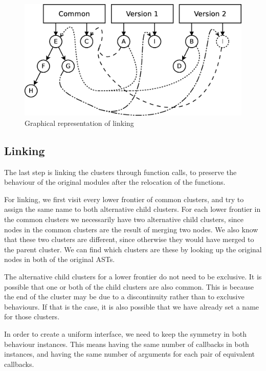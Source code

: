 \begin{figure}
\centering
\includegraphics[width=1\textwidth]{figures/automatic_beh_inf/diagrams/dia5}
\par

\caption{Graphical representation of linking\label{fig:cluster-linking-example}}


\end{figure}



\subsection{Linking}

The last step is linking the clusters through function calls, to preserve
the behaviour of the original modules after the relocation of the
functions.

For linking, we first visit every lower frontier of common clusters,
and try to assign the same name to both alternative child clusters.
For each lower frontier in the common clusters we necessarily have
two alternative child clusters, since nodes in the common clusters
are the result of merging two nodes. We also know that these two clusters
are different, since otherwise they would have merged to the parent
cluster. We can find which clusters are these by looking up the original
nodes in both of the original ASTs.

The alternative child clusters for a lower frontier do not need to
be exclusive. It is possible that one or both of the child clusters
are also common. This is because the end of the cluster may be due
to a discontinuity rather than to exclusive behaviours. If that is
the case, it is also possible that we have already set a name for
those clusters.

In order to create a uniform interface, we need to keep the symmetry
in both behaviour instances. This means having the same number of
callbacks in both instances, and having the same number of arguments
for each pair of equivalent callbacks.

